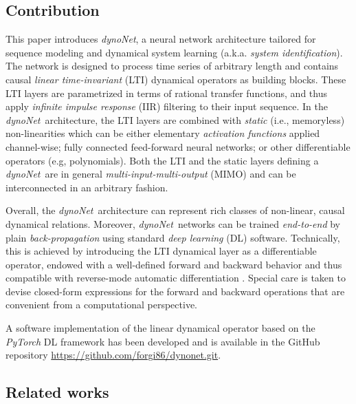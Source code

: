 \documentclass{article}
\newcommand{\Name}{\emph{dynoNet}}
\begin{document}
\subsection{Contribution}
This paper introduces \Name, a neural network architecture tailored for sequence modeling and dynamical system learning (a.k.a. \emph{system identification}). The network is designed to process time series of arbitrary length and contains causal \emph{linear time-invariant} (LTI) dynamical operators as building blocks. 
These LTI layers are parametrized in terms of  rational transfer functions, and thus apply \emph{infinite impulse response} (IIR) filtering to their input sequence. In the \Name\ architecture, the LTI layers are combined with \emph{static} (i.e., memoryless) non-linearities which can be  either elementary \emph{activation functions} applied {channel-wise}; fully connected feed-forward neural networks; or other differentiable operators (e.g, polynomials). 
Both the LTI and the static layers defining a  \Name\ are in general \emph{multi-input-multi-output} (MIMO) and can be interconnected in an arbitrary fashion. 

Overall, the \Name \ architecture can represent rich classes of non-linear, causal dynamical relations. Moreover,  \Name \ networks can be trained \emph{end-to-end} by plain \emph{back-propagation} using standard \emph{deep learning} (DL) software. Technically, this is achieved by introducing the LTI dynamical layer as a differentiable operator, endowed with a well-defined forward and backward behavior and thus compatible with reverse-mode automatic differentiation \cite{baydin2017automatic}.  
Special care is taken to devise closed-form expressions for the forward and backward operations that are convenient from a computational perspective.

A software implementation of the linear dynamical operator based on the \emph{PyTorch} DL framework \cite{paszke:2017automatic} 
has been developed and is available in the GitHub repository \url{https://github.com/forgi86/dynonet.git}.


\subsection{Related works}
\label{sec:related}
\end{document}
